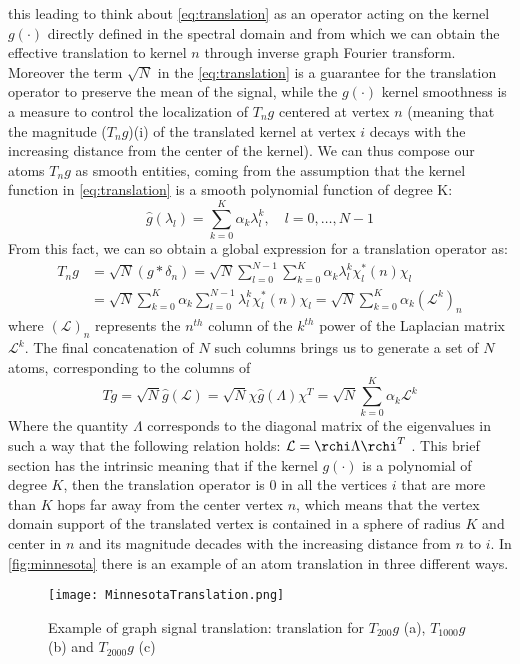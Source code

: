 this leading to think about \autoref{eq:translation} as an operator acting on the kernel $g(\cdot)$ directly defined in the spectral domain and from which we can obtain the effective translation to kernel $n$ through inverse graph Fourier transform. Moreover the term $\sqrt{N}$ in the \autoref{eq:translation} is a guarantee for the translation operator to preserve the mean of the signal, while the $g(\cdot)$ kernel smoothness is a measure to control the localization of $T_n g$ centered at vertex $n$ (meaning that the magnitude ($T_n g$)(i) of the translated kernel at vertex $i$ decays with the increasing distance from the center of the kernel). We can thus compose our atoms $T_n g$ as smooth entities, coming from the assumption that the kernel function in \ref{eq:translation} is a smooth polynomial function of degree K:
\begin{equation}
\hat{g}(\lambda_l) = \sum_{k=0}^{K} \alpha_k\lambda_l^k, \quad l = 0,\dots,N-1
\end{equation}
From this fact, we can so obtain a global expression for a translation operator as:
\begin{align}
T_n g & = \sqrt{N}(g * \delta_n) = \sqrt{N}\sum_{l=0}^{N-1}\sum_{k=0}^{K}\alpha_k\lambda_l^k\chi_l^*(n)\chi_l \\
&= \sqrt{N}\sum_{k=0}^{K}\alpha_k\sum_{l=0}^{N-1}\lambda_l^k\chi_l^*(n)\chi_l = \sqrt{N}\sum_{k=0}^{K}\alpha_k (\mathcal{L}^k)_n
\end{align}
where $(\mathcal{L})_n$ represents the $n^{th}$ column of the $k^{th}$ power of the Laplacian matrix $\mathcal{L}^k$. The final concatenation of $N$ such columns brings us to generate a set of $N$ atoms, corresponding to the columns of
\begin{equation}
Tg = \sqrt{N}\hat{g}(\mathcal{L}) = \sqrt{N}\chi \hat{g}(\Lambda)\chi^T = \sqrt{N}\sum_{k=0}^{K}\alpha_k\mathcal{L}^k
\label{eq:tg}
\end{equation}
Where the quantity $\Lambda$ corresponds to the diagonal matrix of the eigenvalues in such a way that the following relation holds: $\mathcal{L} = \rchi \Lambda \rchi^T$ \cite{Dong2016}. This brief section has the intrinsic meaning that if the kernel $g(\cdot)$ is a polynomial of degree $K$, then the translation operator is $0$ in all the vertices $i$ that are more than $K$ hops far away from the center vertex $n$, which means that the vertex domain support of the translated vertex is contained in a sphere of radius $K$ and center in $n$ and its magnitude decades with the increasing distance from $n$ to $i$.
In \autoref{fig:minnesota} there is an example of an atom translation in three different ways.

\begin{figure}[tb]
  \centering
  \texttt{[image: MinnesotaTranslation.png]}
  \caption{Example of graph signal translation: translation for $T_{200}g$ (a), $T_{1000}g$ (b) and $T_{2000}g$ (c)}
  \label{fig:minnesota}
\end{figure}
